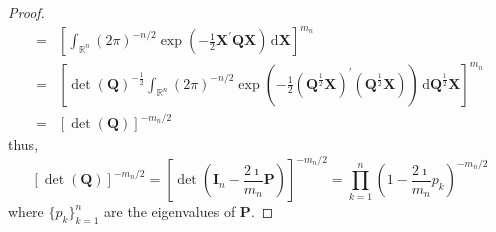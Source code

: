\begin{proof}
\begin{equation*}
\begin{aligned}
            = & \left[\int_{\mathbb{R}^{n}}(2\pi)^{-n/2}\exp\left(-\frac{1}{2}\mathbf{X}^{\prime}\mathbf{Q}\mathbf{X}\right)\,\mathrm{d}\mathbf{X}\right]^{m_{n}}                                                                                                                                                 \\
            = & \left[\operatorname{det}\left(\mathbf{Q}\right)^{-\frac{1}{2}}\int_{\mathbb{R}^{n}}(2\pi)^{-n/2}\exp\left(-\frac{1}{2}\left(\mathbf{Q}^{\frac{1}{2}}\mathbf{X}\right)^{\prime}\left(\mathbf{Q}^{\frac{1}{2}}\mathbf{X}\right)\right)\,\mathrm{d}\mathbf{Q}^{\frac{1}{2}}\mathbf{X}\right]^{m_{n}} \\
            = & \left[\operatorname{det}\left(\mathbf{Q}\right)\right]^{-m_{n}/2}
        \end{aligned}
    \end{equation*}
    thus,
    \begin{equation}
        \left[\operatorname{det}\left(\mathbf{Q}\right)\right]^{-m_{n}/2}=\left[\operatorname{det}\left(\mathbf{I}_{n}-\frac{2\imath}{m_{n}}\mathbf{P}\right)\right]^{-m_{n}/2}=\prod_{k=1}^{n}\left(1-\frac{2\imath}{m_n}p_{k}\right)^{-m_{n}/2}
        \label{eq:characteristic-function-wishart-result-1}
    \end{equation}
    where $\{p_{k}\}_{k=1}^{n}$ are the eigenvalues of $\mathbf{P}$.


\end{proof}
